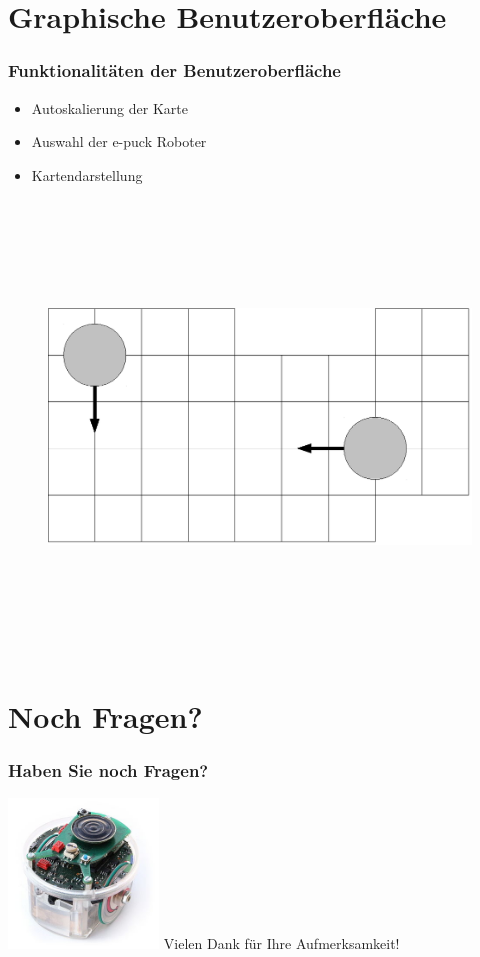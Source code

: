\documentclass{beamer}
\begin{document}
\section{Graphische Benutzeroberfläche}
\begin{frame}
  \frametitle{Funktionalitäten der Benutzeroberfläche}
  	\begin{itemize}
		\item Autoskalierung der Karte
		\item Auswahl der e-puck Roboter
		\item Kartendarstellung
	\end{itemize}  
	\vspace{1cm}
	\begin{figure}[bp]
		\includegraphics[height=12cm]{karte.eps} 
	\end{figure}
\end{frame}

\section{Noch Fragen?}
\begin{frame}
	\frametitle{Haben Sie noch Fragen?}
		\includegraphics[height=4cm]{ende.jpg}
		\vspace{1cm}
	Vielen Dank für Ihre Aufmerksamkeit!
\end{frame}
\end{document}
